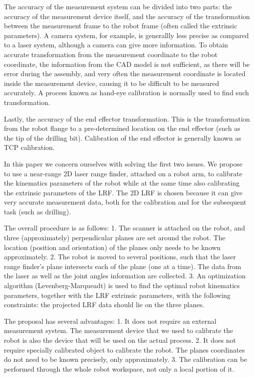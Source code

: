 The accuracy of the measurement system can be divided into two parts: the accuracy of the measurement device itself, and the accuracy of the transformation between the measurement frame to the robot frame (often called the extrinsic parameters). A camera system, for example, is generallly less precise as compared to a laser system, although a camera can give more information. To obtain accurate transformation from the measurement coordinate to the robot coordinate, the information from the CAD model is not sufficient, as there will be error during the assembly, and very often the measurement coordinate is located inside the measurement device, causing it to be difficult to be measured accurately. A process known as hand-eye calibration is normally used to find such transformation. 

Lastly, the accuracy of the end effector transformation. This is the transformation from the robot flange to a pre-determined location on the end effector (such as the tip of the drilling bit). Calibration of the end effector is generally known as TCP calibration. 

In this paper we concern ourselves with solving the first two issues. We propose to use a near-range 2D laser range finder, attached on a robot arm, to calibrate the kinematics parameters of the robot while at the same time also calibrating the extrinsic parameters of the LRF. The 2D LRF is chosen because it can give very accurate measurement data, both for the calibration and for the subsequent task (such as drilling). 

The overall procedure is as follows:
1. The scanner is attached on the robot, and three (approximately) perpendicular planes are set around the robot. The location (position and orientation) of the planes only needs to be known approximately.
2. The robot is moved to several positions, such that the laser range finder's plane intersects each of the plane (one at a time). The data from the laser as well as the joint angles information are collected.
3. An optimization algorithm (Levenberg-Marqueadt) is used to find the optimal robot kinematics parameters, together with the LRF extrinsic parameters, with the following constraints: the projected LRF data should lie on the three planes. 

The proposal has several advantages:
1. It does not require an external measurement system. The measurement device that we used to calibrate the robot is also the device that will be used on the actual process. 
2. It does not require specially calibrated object to calibrate the robot. The planes coordinates do not need to be known precisely, only approximately. 
3. The calibration can be performed through the whole robot workspace, not only a local portion of it. 


